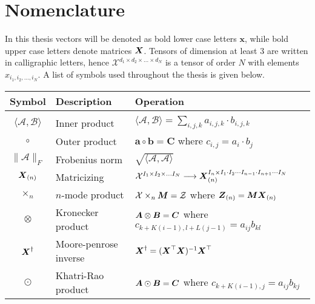 \section{Nomenclature}

In this thesis vectors will be denoted as bold lower case letters $\boldsymbol{x}$, while bold upper case letters denote matrices $\boldsymbol{X}$. Tensors of dimension at least 3 are written in calligraphic letters, hence $\mathcal{X}^{d_1\times d_2 \times \dots \times d_N}$ is a tensor of order $N$ with elements $x_{i_1, i_2, \dots, i_N}$. A list of symbols used throughout the thesis is given below. 

\vspace{1cm}

\begin{tabular}{cll}
    \textbf{Symbol} & \textbf{Description} & \textbf{Operation}  \\ \hline
    & & \\
    $\langle \mathcal{A}, \mathcal{B}\rangle$ & Inner product & $\langle \mathcal{A}, \mathcal{B}\rangle = \sum_{i,j,k} a_{i,j,k}\cdot b_{i,j,k}$ \\
    $\circ$ &  Outer product & $\boldsymbol{a} \circ \boldsymbol{b} = \boldsymbol{C}$ where $c_{i,j} = a_i \cdot b_j$ \\
    $\| \mathcal{A} \|_F$ & Frobenius norm & $\sqrt{\langle \mathcal{A}, \mathcal{A}\rangle}$ \\
    $\boldsymbol{X}_{(n)}$ & Matricizing & $\mathcal{X}^{I_1 \times I_2 \times \dots I_N} \longrightarrow \boldsymbol{X}_{(n)}^{I_n \times I_1 \cdot I_2 \cdots I_{n-1} \cdot I_{n+1} \cdots I_N}$ \\
    $\times_n$ & $n$-mode product & $\mathcal{X}\times_n \boldsymbol{M} = \mathcal{Z}$ where $\boldsymbol{Z}_{(n)} = \boldsymbol{M}\boldsymbol{X}_{(n)}$ \\
    $\otimes$ & Kronecker product & $\boldsymbol{A}\otimes \boldsymbol{B} = \boldsymbol{C}$ where $c_{k + K(i-1), l + L(j-1)} = a_{ij}b_{kl}$ \\
    $\boldsymbol{X}^{\dagger}$ & Moore-penrose inverse & $\boldsymbol{X}^{\dagger} = ( \boldsymbol{X}^\top \boldsymbol{X})^{-1}\boldsymbol{X}^{\top}$ \\
    $\odot$ & Khatri-Rao product & $\boldsymbol{A} \odot \boldsymbol{B} = \boldsymbol{C}$ where $c_{k + K(i-1), j} = a_{ij}b_{kj}$
\end{tabular}